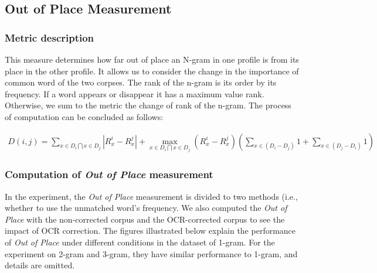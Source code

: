 \subsection{Out of Place Measurement}

\subsubsection{Metric description}

This measure determines how far out of place an N-gram in one profile is from its place in the other profile. It allows us to consider the change in the importance of common word of the two corpses. The rank of the n-gram is its order by its frequency. If a word appears or disappear it has a maximum value rank. Otherwise, we sum to the metric the change of rank of the n-gram. The process of computation can be concluded as follows:

\begin{eqnarray}\label{outofplace}
	D(i, j) = \sum_{x \in D_i \bigcap x \in D_j} |R_x^i - R_x^j| + 
			\max_{x \in D_i \bigcap x \in D_j}(R_x^i - R_x^j) (\sum_{x \in (D_i - D_j)} 1 + \sum_{x \in (D_j - D_i)} 1)
\end{eqnarray}

\subsubsection{Computation of \emph{Out of Place} measurement}

In the experiment, the \emph{Out of Place} measurement is divided to two methods (i.e., whether to use the unmatched word's frequency. We also computed the \emph{Out of Place} with the non-corrected corpus and the OCR-corrected corpus to see the impact of OCR correction. The figures illustrated below explain the performance of \emph{Out of Place} under different conditions in the dataset of 1-gram. For the experiment on 2-gram and 3-gram, they have similar performance to 1-gram, and details are omitted.

